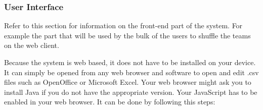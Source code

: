 \subsubsection{User Interface}
	Refer to this section for information on the front-end part of the system. For example the part that will be	used by the bulk of the users to shuffle the teams on the web client.\par
	\vspace{0.3cm}
	
Because the system is web based, it does not have to be installed on your device. It can simply be opened from any web browser and software to open and edit .csv files such as OpenOffice or Microsoft Excel.
Your web browser might ask you to install Java if you do not have the appropriate version. Your JavaScript has to be enabled in your web browser. It can be done by following this steps:

